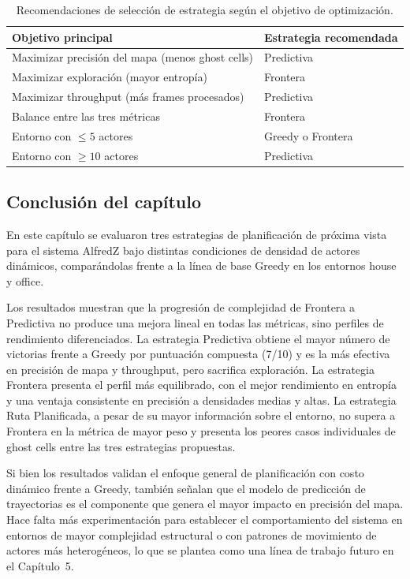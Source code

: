 \begin{table}[htbp]
    \centering
    \caption{Recomendaciones de selección de estrategia según el objetivo de optimización.}%
    \label{tab:comp_recomendaciones}
    \begin{tabular}{lp{7cm}}
        \toprule
        \textbf{Objetivo principal} & \textbf{Estrategia recomendada} \\
        \midrule
        Maximizar precisión del mapa (menos ghost cells) & Predictiva \\
        Maximizar exploración (mayor entropía) & Frontera \\
        Maximizar throughput (más frames procesados) & Predictiva \\
        Balance entre las tres métricas & Frontera \\
        Entorno con $\leq 5$ actores & Greedy o Frontera \\
        Entorno con $\geq 10$ actores & Predictiva \\
        \bottomrule
    \end{tabular}
\end{table}

\subsection{Conclusión del capítulo}

En este capítulo se evaluaron tres estrategias de planificación de próxima vista para el sistema AlfredZ bajo distintas condiciones de densidad de actores dinámicos, comparándolas frente a la línea de base Greedy en los entornos house y office.

Los resultados muestran que la progresión de complejidad de Frontera a Predictiva no produce una mejora lineal en todas las métricas, sino perfiles de rendimiento diferenciados. La estrategia Predictiva obtiene el mayor número de victorias frente a Greedy por puntuación compuesta (7/10) y es la más efectiva en precisión de mapa y throughput, pero sacrifica exploración. La estrategia Frontera presenta el perfil más equilibrado, con el mejor rendimiento en entropía y una ventaja consistente en precisión a densidades medias y altas. La estrategia Ruta Planificada, a pesar de su mayor información sobre el entorno, no supera a Frontera en la métrica de mayor peso y presenta los peores casos individuales de ghost cells entre las tres estrategias propuestas.

Si bien los resultados validan el enfoque general de planificación con costo dinámico frente a Greedy, también señalan que el modelo de predicción de trayectorias es el componente que genera el mayor impacto en precisión del mapa. Hace falta más experimentación para establecer el comportamiento del sistema en entornos de mayor complejidad estructural o con patrones de movimiento de actores más heterogéneos, lo que se plantea como una línea de trabajo futuro en el Capítulo~5.
